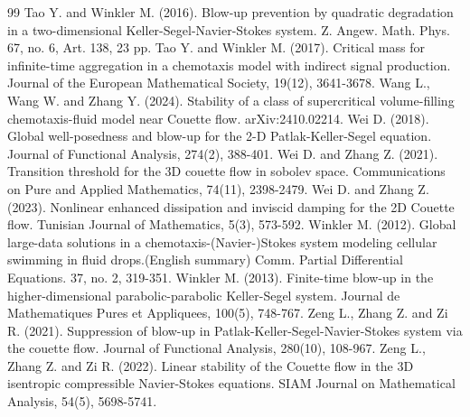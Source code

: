 \documentclass[12pt, reqno]{amsart}
\numberwithin{equation}{section}
\begin{document}
\begin{thebibliography}{99}
 Tao Y. and Winkler M. (2016). Blow-up prevention by quadratic degradation in a two-dimensional Keller-Segel-Navier-Stokes system. Z. Angew. Math. Phys. 67, no. 6, Art. 138, 23 pp.
		  Tao Y. and Winkler M. (2017). Critical mass for infinite-time aggregation in a chemotaxis model with indirect signal production. Journal of the European Mathematical Society, 19(12), 3641-3678. 
		 Wang L., Wang W. and Zhang Y. (2024). Stability of a class of supercritical volume-filling chemotaxis-fluid model near Couette flow. arXiv:2410.02214.
		Wei D. (2018). Global well-posedness and blow-up for the 2-D Patlak-Keller-Segel equation. Journal of Functional Analysis, 274(2), 388-401.
		Wei D. and Zhang Z. (2021). Transition threshold for the 3D couette flow in sobolev space. Communications on Pure and Applied Mathematics, 74(11), 2398-2479.
		 Wei D. and Zhang Z. (2023). Nonlinear enhanced dissipation and inviscid damping for the 2D Couette flow. Tunisian Journal of Mathematics, 5(3), 573-592.
 Winkler M. (2012). Global large-data solutions in a chemotaxis-(Navier-)Stokes system modeling cellular swimming in fluid drops.(English summary) Comm. Partial Differential Equations. 37, no. 2, 319-351.
		Winkler M. (2013). Finite-time blow-up in the higher-dimensional parabolic-parabolic Keller-Segel system. Journal de Mathematiques Pures et Appliquees, 100(5), 748-767.
		Zeng L., Zhang Z.  and Zi R. (2021). Suppression of blow-up in
		Patlak-Keller-Segel-Navier-Stokes system via the couette flow. Journal of Functional Analysis, 280(10), 108-967.
		 Zeng L., Zhang Z. and Zi R. (2022). Linear stability of the Couette flow in the 3D isentropic compressible Navier-Stokes equations. SIAM Journal on Mathematical Analysis, 54(5), 5698-5741. 
		
		
		
		
		
		
		
		
		
		
	\end{thebibliography}
	
	
	
\end{document}

